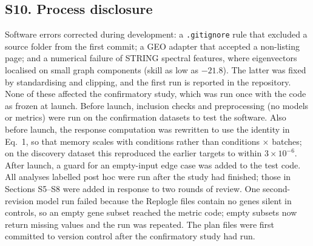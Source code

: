 \subsection*{S10. Process disclosure}
Software errors corrected during development: a \texttt{.gitignore} rule that excluded a source folder from the first commit; a GEO adapter that accepted a non-listing page; and a numerical failure of STRING spectral features, where eigenvectors localised on small graph components (skill as low as $-21.8$). The latter was fixed by standardising and clipping, and the first run is reported in the repository. None of these affected the confirmatory study, which was run once with the code as frozen at launch. Before launch, inclusion checks and preprocessing (no models or metrics) were run on the confirmation datasets to test the software. Also before launch, the response computation was rewritten to use the identity in Eq.~1, so that memory scales with conditions rather than conditions $\times$ batches; on the discovery dataset this reproduced the earlier targets to within $3\times10^{-6}$. After launch, a guard for an empty-input edge case was added to the test code. All analyses labelled post hoc were run after the study had finished; those in Sections S5--S8 were added in response to two rounds of review. One second-revision model run failed because the Replogle files contain no genes silent in controls, so an empty gene subset reached the metric code; empty subsets now return missing values and the run was repeated. The plan files were first committed to version control after the confirmatory study had run.

